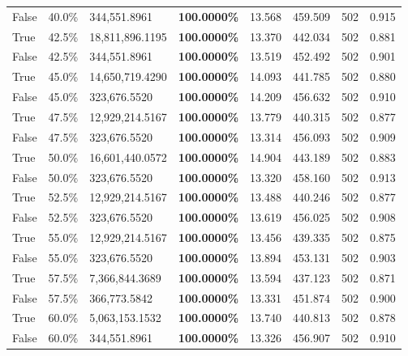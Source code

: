 \begin{table}[H]
\begin{tabular}{lllrllll}
\cline{1-8}
False & 40.0\% & 344,551.8961 & \bfseries \color{red} 100.0000\% & 13.568 & 459.509 & 502 & 0.915 \\
\cline{1-8}
True & 42.5\% & 18,811,896.1195 & \bfseries \color{red} 100.0000\% & 13.370 & 442.034 & 502 & 0.881 \\
\cline{1-8}
False & 42.5\% & 344,551.8961 & \bfseries \color{red} 100.0000\% & 13.519 & 452.492 & 502 & 0.901 \\
\cline{1-8}
True & 45.0\% & 14,650,719.4290 & \bfseries \color{red} 100.0000\% & 14.093 & 441.785 & 502 & 0.880 \\
\cline{1-8}
False & 45.0\% & 323,676.5520 & \bfseries \color{red} 100.0000\% & 14.209 & 456.632 & 502 & 0.910 \\
\cline{1-8}
True & 47.5\% & 12,929,214.5167 & \bfseries \color{red} 100.0000\% & 13.779 & 440.315 & 502 & 0.877 \\
\cline{1-8}
False & 47.5\% & 323,676.5520 & \bfseries \color{red} 100.0000\% & 13.314 & 456.093 & 502 & 0.909 \\
\cline{1-8}
True & 50.0\% & 16,601,440.0572 & \bfseries \color{red} 100.0000\% & 14.904 & 443.189 & 502 & 0.883 \\
\cline{1-8}
False & 50.0\% & 323,676.5520 & \bfseries \color{red} 100.0000\% & 13.320 & 458.160 & 502 & 0.913 \\
\cline{1-8}
True & 52.5\% & 12,929,214.5167 & \bfseries \color{red} 100.0000\% & 13.488 & 440.246 & 502 & 0.877 \\
\cline{1-8}
False & 52.5\% & 323,676.5520 & \bfseries \color{red} 100.0000\% & 13.619 & 456.025 & 502 & 0.908 \\
\cline{1-8}
True & 55.0\% & 12,929,214.5167 & \bfseries \color{red} 100.0000\% & 13.456 & 439.335 & 502 & 0.875 \\
\cline{1-8}
False & 55.0\% & 323,676.5520 & \bfseries \color{red} 100.0000\% & 13.894 & 453.131 & 502 & 0.903 \\
\cline{1-8}
True & 57.5\% & 7,366,844.3689 & \bfseries \color{red} 100.0000\% & 13.594 & 437.123 & 502 & 0.871 \\
\cline{1-8}
False & 57.5\% & 366,773.5842 & \bfseries \color{red} 100.0000\% & 13.331 & 451.874 & 502 & 0.900 \\
\cline{1-8}
True & 60.0\% & 5,063,153.1532 & \bfseries \color{red} 100.0000\% & 13.740 & 440.813 & 502 & 0.878 \\
\cline{1-8}
False & 60.0\% & 344,551.8961 & \bfseries \color{red} 100.0000\% & 13.326 & 456.907 & 502 & 0.910 \\

\end{tabular}
\end{table}
